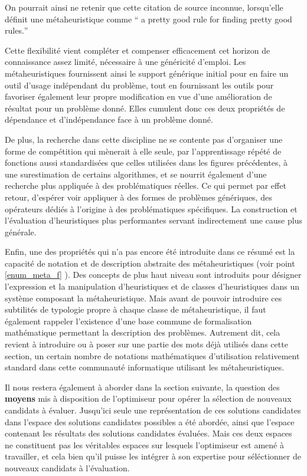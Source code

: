 On pourrait ainsi ne retenir que cette citation de source inconnue, lorsqu'elle définit une métaheuristique comme \foreignquote{english}{ a pretty good rule for finding pretty good rules.}

Cette flexibilité vient compléter et compenser efficacement cet horizon de connaissance assez limité, nécessaire à une généricité d'emploi. Les métaheuristiques fournissent ainsi le support générique initial pour en faire un outil d'usage indépendant du problème, tout en fournissant les outils pour favoriser également leur propre modification en vue d'une amélioration de résultat pour un problème donné. Elles cumulent donc ces deux propriétés de dépendance et d'indépendance face à un problème donné.

De plus, la recherche dans cette discipline ne se contente pas d'organiser une forme de compétition qui mènerait à elle seule, par l'apprentissage répété de fonctions aussi standardisées que celles utilisées dans les figures précédentes, à une surestimation de certains algorithmes, et se nourrit également d'une recherche plus appliquée à des problématiques réelles. Ce qui permet par effet retour, d'espérer voir appliquer à des formes de problèmes génériques, des opérateurs dédiés à l'origine à des problématiques spécifiques. La construction et l'évaluation d'heuristiques plus performantes servant indirectement une cause plus générale.

Enfin, une des propriétés qui n'a pas encore été introduite dans ce résumé est la capacité de notation et de description abstraite des métaheuristiques (voir point \ref{enum_meta_f} ). Des concepts de plus haut niveau sont introduits pour désigner l'expression et la manipulation d'heuristiques et de classes d'heuristiques dans un système composant la métaheuristique. Mais avant de pouvoir introduire ces subtilités de typologie propre à chaque classe de métaheuristique, il faut également rappeler l'existence d'une base commune de formalisation mathématique permettant la description des problèmes. Autrement dit, cela revient à introduire ou à poser sur une partie des mots déjà utilisés dans cette section, un certain nombre de notations mathématiques d'utilisation relativement standard dans cette communauté informatique utilisant les métaheuristiques.

Il nous restera également à aborder dans la section suivante, la question des \textbf{moyens} mis à disposition de l'optimiseur pour opérer la sélection de nouveaux candidats à évaluer. Jusqu'ici seule une représentation de ces solutions candidates dans l'espace des solutions candidates possibles a été abordée, ainsi que l'espace contenant les résultats des solutions candidates évaluées. Mais ces deux espaces ne constituent pas les véritables espaces sur lesquels l'optimiseur est amené à travailler, et cela bien qu'il puisse les intégrer à son expertise pour séléctionner de nouveaux candidats à l'évaluation.

